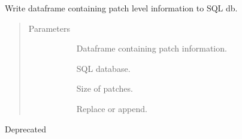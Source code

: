 \documentclass[letterpaper,10pt,english]{sphinxmanual}
\begin{document}
\begin{fulllineitems}
\label{\detokenize{index:pathflowai.utils.df2sql}}
Write dataframe containing patch level information to SQL db.
\begin{quote}\begin{description}
\item[{Parameters}] \leavevmode\begin{description}
\item[{}] \leavevmode
Dataframe containing patch information.

\item[{}] \leavevmode
SQL database.

\item[{}] \leavevmode
Size of patches.

\item[{}] \leavevmode
Replace or append.

\end{description}

\end{description}\end{quote}

\end{fulllineitems}


\begin{fulllineitems}
\label{\detokenize{index:pathflowai.utils.dir2images}}
Deprecated

\end{fulllineitems}

\end{document}
